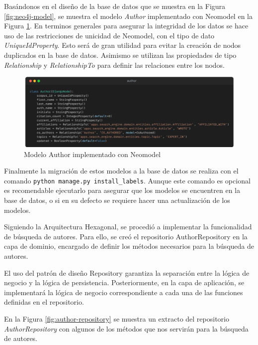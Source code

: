 Basándonos en el diseño de la base de datos que se muestra en la Figura \ref{fig:neo4j-model},
se muestra el modelo \textit{Author} implementado con Neomodel en la Figura \ref{fig:author-model}.
En terminos generales para asegurar la integridad de los datos se hace uso  de las restricciones de unicidad de Neomodel, con el tipo de dato \textit{UniqueIdProperty}.
Esto será de gran utilidad para evitar la creación de nodos duplicados en la base de datos.
Asimismo se utilizan las propiedades de tipo \textit{Relationship} y \textit{RelationshipTo} para definir las relaciones entre los nodos.

\begin{figure}[H]
    \centering
    \includegraphics[scale=0.12]{../02Figures/02Chapter/Sprints/Sprint-3/author-neomodel.png}
    \caption{Modelo Author implementado con Neomodel}
    \label{fig:author-model}
\end{figure}

Finalmente la migración de estos modelos a la base de datos se realiza con el comando \texttt{python manage.py install\_labels}.
Aunque este comando es opcional es recomendable ejecutarlo para asegurar que los modelos se encuentren en la base de datos, o si en su defecto se requiere hacer una actualización de los modelos.

Siguiendo la Arquitectura Hexagonal, se procedió a implementar la funcionalidad de búsqueda de autores.
Para ello, se creó el repositorio AuthorRepository en la capa de dominio, encargado de definir los métodos necesarios para la búsqueda de autores.

El uso del patrón de diseño Repository garantiza la separación entre la lógica de negocio y la lógica de persistencia. Posteriormente, en la capa de aplicación, se implementará la lógica de negocio correspondiente a cada una de las funciones definidas en el repositorio.

En la Figura \ref{fig:author-repository} se muestra un extracto del repositorio \textit{AuthorRepository} con algunos de los métodos que nos servirán para la búsqueda de autores.

